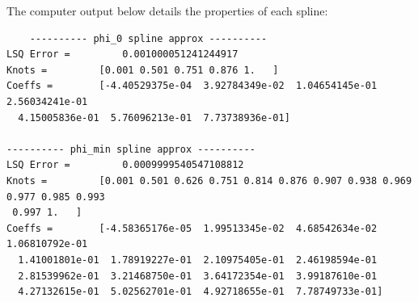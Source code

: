 The computer output below details the properties of each spline:

{\small\begin{verbatim}
    ---------- phi_0 spline approx ----------
LSQ Error =         0.001000051241244917
Knots =         [0.001 0.501 0.751 0.876 1.   ]
Coeffs =        [-4.40529375e-04  3.92784349e-02  1.04654145e-01  2.56034241e-01
  4.15005836e-01  5.76096213e-01  7.73738936e-01]

---------- phi_min spline approx ----------
LSQ Error =         0.0009999540547108812
Knots =         [0.001 0.501 0.626 0.751 0.814 0.876 0.907 0.938 0.969 0.977 0.985 0.993
 0.997 1.   ]
Coeffs =        [-4.58365176e-05  1.99513345e-02  4.68542634e-02  1.06810792e-01
  1.41001801e-01  1.78919227e-01  2.10975405e-01  2.46198594e-01
  2.81539962e-01  3.21468750e-01  3.64172354e-01  3.99187610e-01
  4.27132615e-01  5.02562701e-01  4.92718655e-01  7.78749733e-01]
\end{verbatim}}